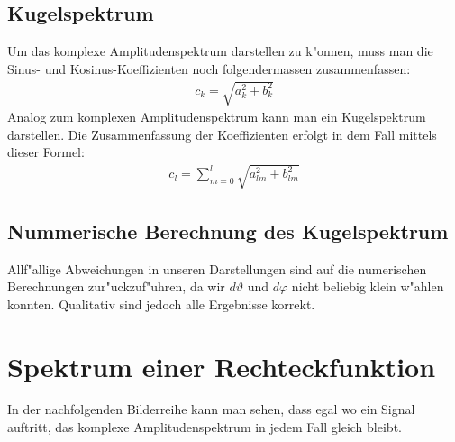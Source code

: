 \begin{refsection}
\subsection{Kugelspektrum}
Um das komplexe Amplitudenspektrum darstellen zu k"onnen, muss man die
Sinus- und Kosinus-Koeffizienten noch folgendermassen zusammenfassen:
\begin{align*}
c_k= \sqrt{a^2_{k}+b^2_{k}}
\end{align*}
Analog zum komplexen Amplitudenspektrum kann man ein Kugelspektrum 
darstellen. 
Die Zusammenfassung der Koeffizienten erfolgt in dem Fall mittels 
dieser Formel:
\begin{align*}
c_l=\sum_{m=0}^l \sqrt{a^2_{lm}+b^2_{lm}}
\end{align*}

\subsection{Nummerische Berechnung des Kugelspektrum}
Allf"allige Abweichungen in unseren Darstellungen sind auf die 
numerischen Berechnungen zur"uckzuf"uhren, da wir 
$d\vartheta$ und $d\varphi$ nicht beliebig klein w"ahlen konnten.
Qualitativ sind jedoch alle Ergebnisse korrekt.

\section{Spektrum einer Rechteckfunktion}
In der nachfolgenden Bilderreihe kann man sehen, dass egal wo ein 
Signal auftritt, das komplexe Amplitudenspektrum in jedem Fall gleich 
bleibt.


\end{refsection}
